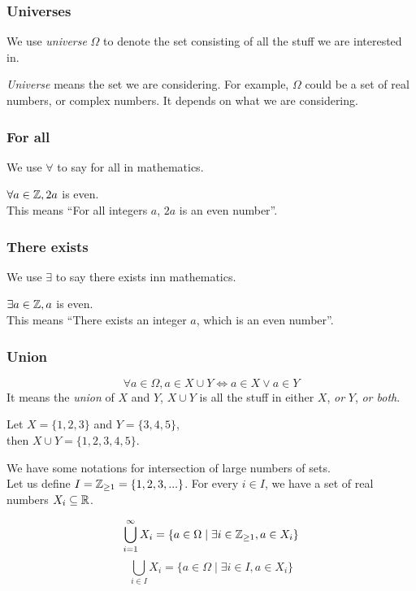 \documentclass[a4paper]{article}
\begin{document}
\subsubsection{Universes}
\begin{notation}
We use \emph{universe} $\Omega$ to denote the set consisting of all the stuff we are interested in.
\end{notation}
\emph{Universe} means the set we are considering. For example, $\Omega$ could be a set of real numbers, or complex numbers. It depends on what we are considering.

\subsubsection{For all}
\begin{notation}
We use $\forall$ to say for all in mathematics.
\end{notation}

\begin{eg}
$\forall a \in \mathbb{Z}, 2a$ is even.\\
This means ``For all integers $a$, $2a$ is an even number''.
\end{eg}

\subsubsection{There exists}
\begin{notation}
We use $\exists$ to say there exists inn mathematics.
\end{notation}

\begin{eg}
$\exists a \in \mathbb{Z}, a$ is even.\\
This means ``There exists an integer $a$, which is an even number''.
\end{eg}

\subsubsection{Union}
\begin{defi}[Unions]
\[
	\forall a \in \Omega, a \in X \cup Y \iff a \in X \lor a \in Y
\]
It means the \emph{union} of $X$ and $Y$, $X \cup Y$ is all the stuff in either $X$, \emph{or} $Y$, \emph{or both}.
\end{defi}
\begin{eg}
Let $X = \{ 1, 2, 3 \}$ and $Y= \{ 3, 4, 5 \}$,\\
then $X \cup Y = \{ 1, 2, 3, 4, 5 \}$.
\end{eg}
We have some notations for intersection of large numbers of sets.\\
Let us define $I = \mathbb{Z}_{\geq1} = \{1,2,3,...\}$. For every $i \in I$, we have a set of real numbers $X_i \subseteq \mathbb{R}$.
\begin{notation}
$$\bigcup^\infty_{i=1} X_i = \{a \in \Omega \mid \exists i \in \mathbb{Z}_{\geq1}, a \in X_i\}$$
$$\bigcup_{i \in I} X_i = \{a \in \Omega \mid \exists i \in I, a \in X_i\}$$
\end{notation}
\end{document}
